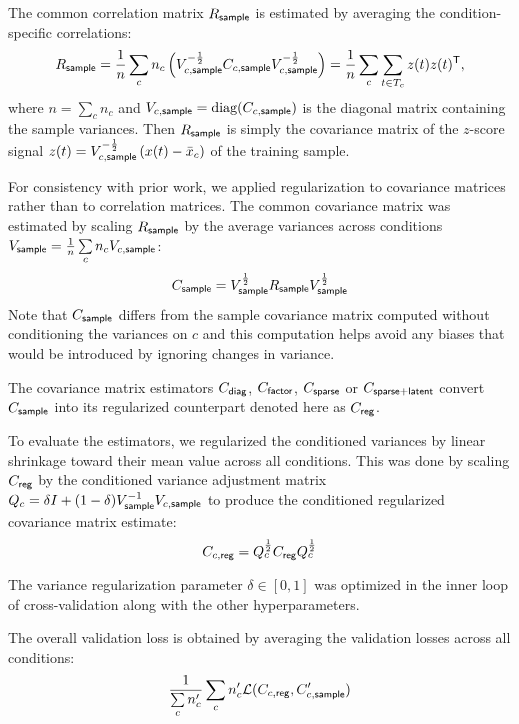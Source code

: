 The common correlation matrix $R_{\sf sample}$ is estimated by averaging the condition-specific correlations:
\begin{equation}
    R_{\sf sample}  
    = \frac 1 n \sum\limits_c n_c \left(V_{c,\sf sample}^{-\frac 1 2}C_{c,\sf sample}V_{c,\sf sample}^{-\frac 1 2}\right)
    = \frac 1 n \sum\limits_c \sum\limits_{t \in T_c} z(t)z(t)^{\sf T},
\end{equation}
where $n=\sum\limits_c n_c$ and $V_{c,\sf sample} = \mbox{diag}(C_{c,\sf sample})$ is the diagonal matrix containing the sample variances. Then $R_{\sf sample}$ is simply the covariance matrix of the $z$-score signal $z(t) = V_{c,\sf sample}^{-\frac 1 2} \left(x(t) - \bar x_c\right)$ of the training sample.

For consistency with prior work, we applied regularization to covariance matrices rather than to correlation matrices. The common covariance matrix was estimated by scaling $R_{\sf sample}$ by the average variances across conditions $V_{\sf sample} = \frac 1 n \sum\limits_c n_c V_{c,\sf sample}$:
\begin{equation}
    C_{\sf sample} = V_{\sf sample}^{\frac 1 2} R_{\sf sample} V_{\sf sample}^{\frac 1 2}
\end{equation}
Note that $C_{\sf sample}$ differs from the sample covariance matrix computed without conditioning the variances on $c$ and this computation helps avoid any biases that would be introduced by ignoring changes in variance.

The covariance matrix estimators $C_{\sf diag}$, $C_{\sf factor}$, $C_{\sf sparse}$ or $C_{\sf sparse+latent}$ convert $C_{\sf sample}$ into its regularized counterpart denoted here as $C_{\sf reg}$.

To evaluate the estimators, we regularized the conditioned variances by linear shrinkage toward their mean value across all conditions. This was done by scaling $C_{\sf reg}$ by the conditioned variance adjustment matrix $Q_c = \delta I + (1-\delta)V_{\sf sample}^{-1} V_{c,\sf sample}$ to produce the conditioned regularized covariance matrix estimate:
\begin{equation}
    C_{c,\sf reg} = Q_c^{\frac 1 2} C_{\sf reg} Q_c^{\frac 1 2}
\end{equation}

The variance regularization parameter $\delta \in [0,1]$ was optimized in the inner loop of cross-validation along with the other hyperparameters.

The overall validation loss is obtained by averaging the validation losses across all conditions:
\begin{equation}\label{eq:full-loss}
    \frac 1 {\sum\limits_c n_c^\prime}\sum\limits_c n_c^\prime \mathcal L(C_{c,\sf reg}, C_{c,\sf sample}^\prime) 
\end{equation}

